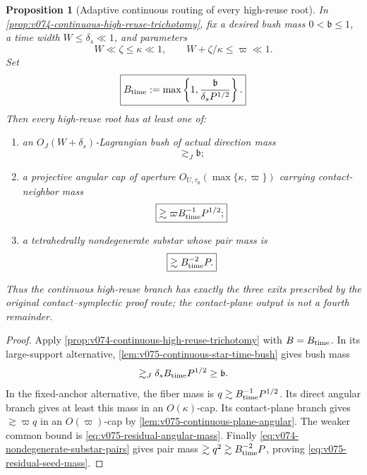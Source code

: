\documentclass[10pt]{article}
\newtheorem{proposition}[theorem]{Proposition}
\begin{document}
\begin{proposition}[Adaptive continuous routing of every high-reuse root]
\label{prop:v075-adaptive-continuous-routing}
In \cref{prop:v074-continuous-high-reuse-trichotomy}, fix a desired bush mass
\(0<\mathfrak b\le1\), a time width \(W\le\delta_s\ll1\), and parameters
\[
W\ll\zeta\le\kappa\ll1,
\qquad
W+\zeta/\kappa\le\varpi\ll1.
\]
Set
\begin{equation}
\label{eq:v075-adaptive-time-amplification}
\boxed{
B_{\rm time}
:=
\max\left\{
1,\frac{\mathfrak b}{\delta_sP^{1/2}}
\right\}.
}
\end{equation}
Then every high-reuse root has at least one of:
\begin{enumerate}[label=\textnormal{(\roman*)}]
\item an \(O_J(W+\delta_s)\)-Lagrangian bush of actual direction mass
  \begin{equation}
  \label{eq:v075-target-bush}
  \boxed{\gtrsim_J\mathfrak b;}
  \end{equation}
\item a projective angular cap of aperture
  \(O_{U,\tau_0}(\max\{\kappa,\varpi\})\) carrying contact-neighbor mass
  \begin{equation}
  \label{eq:v075-residual-angular-mass}
  \boxed{
  \gtrsim
  \varpi B_{\rm time}^{-1}P^{1/2};
  }
  \end{equation}
\item a tetrahedrally nondegenerate substar whose pair mass is
  \begin{equation}
  \label{eq:v075-residual-seed-mass}
  \boxed{
  \gtrsim
  B_{\rm time}^{-2}P.
  }
  \end{equation}
\end{enumerate}
Thus the continuous high-reuse branch has exactly the three exits prescribed by the original
contact--symplectic proof route; the contact-plane output is not a fourth remainder.
\end{proposition}

\begin{proof}
Apply \cref{prop:v074-continuous-high-reuse-trichotomy} with \(B=B_{\rm time}\).
In its large-support alternative,
\cref{lem:v075-continuous-star-time-bush} gives bush mass
\[
\gtrsim_J
\delta_sB_{\rm time}P^{1/2}
\ge\mathfrak b.
\]
In the fixed-anchor alternative, the fiber mass is
\(q\gtrsim B_{\rm time}^{-1}P^{1/2}\).  Its direct angular branch gives at least this mass in an
\(O(\kappa)\)-cap.  Its contact-plane branch gives
\(\gtrsim\varpi q\) in an \(O(\varpi)\)-cap by
\cref{lem:v075-continuous-plane-angular}.  The weaker common bound is
\eqref{eq:v075-residual-angular-mass}.  Finally
\eqref{eq:v074-nondegenerate-substar-pairs} gives pair mass
\(\gtrsim q^2\gtrsim B_{\rm time}^{-2}P\), proving
\eqref{eq:v075-residual-seed-mass}.
\end{proof}
\end{document}
